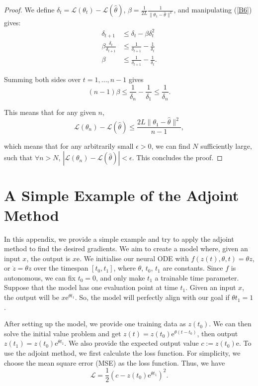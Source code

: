 \documentclass[a4paper,11pt,titlepage]{article}
\theoremstyle{definition}
\theoremstyle{plain}
\theoremstyle{remark}
\begin{document}
\begin{proof}
    We define $\delta_t = \mathcal{L}(\theta_{t}) - \mathcal{L}(\hat{\theta})$, $\beta = \frac{1}{2L} \frac{1}{\| \theta_1 - \hat{\theta} \|^2}$, and manipulating (\ref{B6}) gives:
    \begin{align*}
        \delta_{t+1} &\leq \delta_t - \beta \delta_t^2 \\
        \beta \frac{\delta_t}{\delta_{t+1}} &\leq \frac{1}{\delta_{t+1}} - \frac{1}{\delta_{t}} \\
        \beta &\leq \frac{1}{\delta_{t+1}} - \frac{1}{\delta_{t}}.
    \end{align*}
    
    Summing both sides over $t = 1, ..., n - 1$ gives 
    $$
    (n-1)\beta \leq \frac{1}{\delta_n} - \frac{1}{\delta_1} \leq \frac{1}{\delta_n}.
    $$
    
    This means that for any given $n$,
    \begin{equation}
        \mathcal{L}(\theta_n) - \mathcal{L}(\hat{\theta}) \leq \frac{2L\|\theta_1 - \hat{\theta}\|^2}{n-1},
    \end{equation}
    
    which means that for any arbitrarily small $\epsilon > 0$, we can find $N$ sufficiently large, such that $\forall n > N$, $|\mathcal{L}(\theta_n) - \mathcal{L}(\hat{\theta})| < \epsilon$. This concludes the proof.
\end{proof}

\pagebreak
\section{A Simple Example of the Adjoint Method}
\label{sec:adjmethod}

In this appendix, we provide a simple example and try to apply the adjoint method to find the desired gradients. We aim to create a model where, given an input $x$, the output is $x\mathrm{e}$. We initialise our neural ODE with $f(z(t),\theta,t)=\theta z$, or $\dot{z}=\theta z$ over the timespan $[t_0,t_1]$, where $\theta$, $t_0$, $t_1$ are constants. Since $f$ is autonomous, we can fix $t_0 = 0$, and only make $t_1$ a trainable time parameter. Suppose that the model has one evaluation point at time $t_1$. Given an input $x$, the output will be $x\mathrm{e}^{\theta t_1}$. So, the model will perfectly align with our goal if $\theta t_1=1$.

After setting up the model, we provide one training data as $z(t_0)$. We can then solve the initial value problem and get $z(t) = z(t_0)\mathrm{e}^{\theta(t-t_0)}$, then output $z(t_1)=z(t_0)\mathrm{e}^{\theta t_1}$. We also provide the expected output value $c:=z(t_0)\mathrm{e}$.
To use the adjoint method, we first calculate the loss function. For simplicity, we choose the mean square error (MSE) as the loss function. Thus, we have
$$\mathcal{L} = \frac{1}{2}\left(c-z(t_0)\mathrm{e}^{\theta t_1}\right)^2.$$
\end{document}
